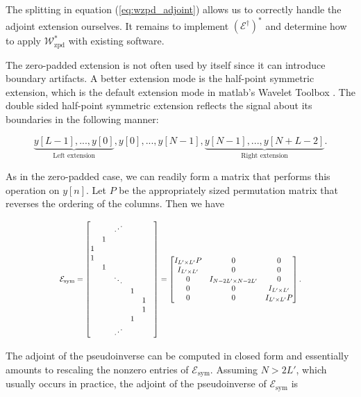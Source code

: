 \documentclass[journal]{IEEEtran}
\newcommand\scalemath[2]{\scalebox{#1}{\mbox{\ensuremath{\displaystyle #2}}}}
\begin{document}
\noindent The splitting in equation (\ref{eq:wzpd_adjoint}) allows us to correctly handle the adjoint extension ourselves.  It remains to implement $\left(\mathcal{E}^\dagger\right)^\ast$ and determine how to apply $\mathcal{W}^\ast_\text{zpd}$ with existing software.

The zero-padded extension is not often used by itself since it can introduce boundary artifacts.
 A better extension mode is the half-point symmetric extension, which is the default extension mode in {\sc matlab}'s Wavelet Toolbox \cite{matlab_wt_2015}.  The double sided half-point symmetric extension reflects the signal about its boundaries in the following manner:

\[ \underbrace{y[L-1], ..., y[0]}_\text{Left extension}, y[0], ..., y[N-1], \underbrace{y[N-1], ..., y[N+L-2]}_\text{Right extension}. \] 

\noindent As in the zero-padded case, we can readily form a matrix that performs this operation on $y[n]$.  Let $P$ be the appropriately sized permutation matrix that reverses the ordering of the columns.  Then we have

\[ \scalemath{0.8}{\mathcal{E}_\text{sym} = \begin{bmatrix} & & \iddots & & &\\ & 1 &&&&\\ 1&&&&&\\1&&&&\\&1&&&&\\&&\ddots&&&\\&&&1&\\&&&&1\\&&&&1\\&&&1&\\&&\iddots&&\end{bmatrix} = \begin{bmatrix}I_{L'\times L'}P & 0 & 0\\I_{L'\times L'} & 0 & 0\\0 & I_{N-2L'\times N-2L'} & 0\\0&0&I_{L'\times L'}\\0&0&I_{L'\times L'}P\end{bmatrix}.} \]

\noindent The adjoint of the pseudoinverse can be computed in closed form and essentially amounts to rescaling the nonzero entries of $\mathcal{E}_\text{sym}$.  Assuming $N > 2L'$, which usually occurs in practice, the adjoint of the  pseudoinverse of $\mathcal{E}_\text{sym}$ is 
\end{document}
